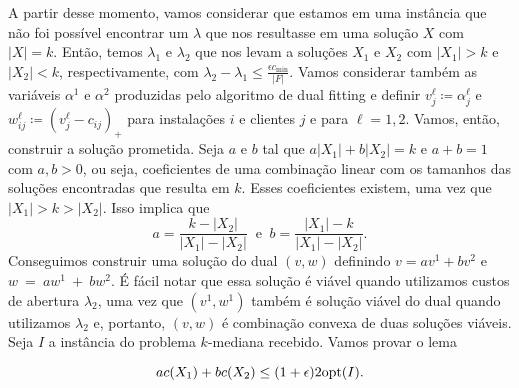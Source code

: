 A partir desse momento, vamos considerar que estamos em uma instância que não foi possível encontrar um $\lambda$ que nos resultasse em uma solução $X$ com $|X| = k$. Então, temos $\lambda_1$ e $\lambda_2$ que nos levam a soluções $X_1$ e $X_2$ com $|X_1| > k$ e $|X_2| < k$, respectivamente, com $\lambda_2 - \lambda_1 \leq \frac{\epsilon c_{\min}}{|F|}$. Vamos considerar também as variáveis $\alpha^1$ e $\alpha^2$ produzidas pelo algoritmo de dual fitting e definir $v_j^\ell \coloneqq \alpha_j^\ell$ e $w_{ij}^\ell \coloneqq (v_j^\ell - c_{ij})_+$ para instalações $i$ e clientes $j$ e para $\ell = 1,2$. Vamos, então, construir a solução prometida. Seja $a$ e $b$ tal que $a|X_1| + b|X_2| = k$ e $a + b = 1$ com $a,b>0$, ou seja, coeficientes de uma combinação linear com os tamanhos das soluções encontradas que resulta em $k$. Esses coeficientes existem, uma vez que $|X_1| > k > |X_2|$. Isso implica que 
\[ a = \frac{k - |X_2|}{|X_1| - |X_2|} \ \text{ e }\ b = \frac{|X_1| - k}{|X_1| - |X_2|}.\]
Conseguimos construir uma solução do dual $(v,w)$ definindo $v = av^1 + bv^2$ e $w~=~aw^1~+~bw^2$. É fácil notar que essa solução é viável quando utilizamos custos de abertura $\lambda_2$, uma vez que $(v^1,w^1)$ também é solução viável do dual quando utilizamos $\lambda_2$ e, portanto, $(v,w)$ é combinação convexa de duas soluções viáveis. Seja $I$ a instância do problema $k$-mediana recebido. Vamos provar o lema 
\begin{lemma}
    \label{k-median_relLag_lema1}
    \[ac(X_1) + bc(X_2) \leq (1+\epsilon) 2\mathrm{opt}(I).\]
\end{lemma}
